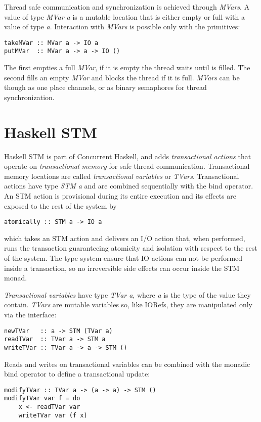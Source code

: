 Thread safe communication and synchronization is achieved through \emph{MVars}.
A value of type \emph{MVar a} is a mutable location that is either empty or full with a value of type \emph{a}.
Interaction with \emph{MVars} is possible only with the primitives:
\begin{lstlisting}
takeMVar :: MVar a -> IO a
putMVar  :: MVar a -> a -> IO ()
\end{lstlisting}
The first empties a full \emph{MVar}, if it is empty the thread waits until is filled. The second fills an empty \emph{MVar} and blocks the thread if it is full. \emph{MVars} can be though as one place channels, or as binary semaphores for thread synchronization.

\section{Haskell STM}
\label{sec:stm}
Haskell STM is part of Concurrent Haskell, and adds \emph{transactional actions} that operate on \emph{transactional memory} for safe thread communication. Transactional memory locations are called \emph{transactional variables} or \emph{TVars}.
Transactional actions have type \emph{STM a} and are combined sequentially with the bind operator.
An STM action is provisional during its entire execution and its effects are exposed to the rest of the system by 
\begin{lstlisting}
atomically :: STM a -> IO a
\end{lstlisting}
which takes an STM action and delivers an I/O action that, when performed, runs the transaction guaranteeing atomicity and isolation with respect to the rest of the system.
The type system ensure that IO actions can not be performed inside a transaction, so no irreversible side effects can occur inside the STM monad.

\emph{Transactional variables} have type \emph{TVar a}, where \emph{a} is the type of the value they contain. \emph{TVars} are mutable variables so, like IORefs, they are manipulated only via the interface:
\begin{lstlisting}
newTVar   :: a -> STM (TVar a)
readTVar  :: TVar a -> STM a
writeTVar :: TVar a -> a -> STM ()
\end{lstlisting}

Reads and writes on transactional variables can be combined with the monadic bind operator to define a transactional update:

\begin{lstlisting}
modifyTVar :: TVar a -> (a -> a) -> STM ()
modifyTVar var f = do
    x <- readTVar var
    writeTVar var (f x)
\end{lstlisting}

